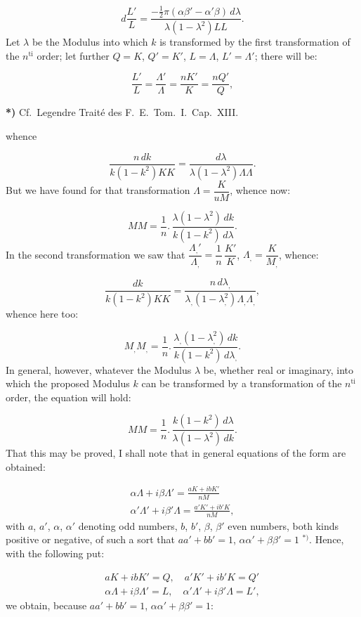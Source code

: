 \documentclass{article}
\begin{document}
\[
d\frac{L'}{L}=\frac{-\frac{1}{2}\pi(\alpha\beta'-\alpha'\beta)\,d\lambda}{\lambda(1-\lambda^{2})LL}.
\]
Let $\lambda$ be the Modulus into which $k$ is transformed by the first transformation of the $n^{\mathrm{ti}}$ order; let further $Q=K$, $Q'=K'$, $L=\Lambda$, $L'=\Lambda'$; there will be:

\[
\frac{L'}{L}=\frac{\Lambda'}{\Lambda}=\frac{nK'}{K}=\frac{nQ'}{Q},
\]

\textbf{*)} Cf.\ Legendre Traité des F.\ E.\ Tom.\ I.\ Cap.\ XIII.


whence

\[
\frac{n\,dk}{k(1-k^{2})KK}=\frac{d\lambda}{\lambda(1-\lambda^{2})\Lambda\Lambda}.
\]
But we have found for that transformation $\Lambda=\dfrac{K}{uM}$, whence now:

\[
MM=\frac{1}{n}.\,\frac{\lambda(1-\lambda^{2})\,dk}{k(1-k^{2})\,d\lambda}.
\]
In the second transformation we saw that $\dfrac{\Lambda_{,}'}{\Lambda_{,}}=\dfrac{1}{n}\,\dfrac{K'}{K}$, $\Lambda_{,}=\dfrac{K}{M_{,}}$, whence:

\[
\frac{dk}{k(1-k^{2})KK}=\frac{n\,d\lambda_{,}}{\lambda_{,}(1-\lambda_{,}^{2})\Lambda_{,}\Lambda_{,}},
\]
whence here too:

\[
M_{,}M_{,}=\frac{1}{n}.\,\frac{\lambda_{,}(1-\lambda_{,}^{2})\,dk}{k(1-k^{2})\,d\lambda_{,}}.
\]
In general, however, whatever the Modulus $\lambda$ be, whether real or imaginary, into which the proposed Modulus $k$ can be transformed by a transformation of the $n^{\mathrm{ti}}$ order, the equation will hold:

\[
MM=\frac{1}{n}.\,\frac{k(1-k^{2})\,d\lambda}{\lambda(1-\lambda^{2})\,dk}.
\]
That this may be proved, I shall note that in general equations of the form are obtained:

\[
\begin{gathered}
\alpha\Lambda+i\beta\Lambda'=\frac{aK+ibK'}{nM}\\[1.5ex]
\alpha'\Lambda'+i\beta'\Lambda=\frac{a'K'+ib'K}{nM},
\end{gathered}
\]
with $a$, $a'$, $\alpha$, $\alpha'$ denoting odd numbers, $b$, $b'$, $\beta$, $\beta'$ even numbers, both kinds positive or negative, of such a sort that $aa'+bb'=1$, $\alpha\alpha'+\beta\beta'=1$ ${}^{*)}$. Hence, with the following put:

\[
\begin{gathered}
aK+ibK'=Q,\quad a'K'+ib'K=Q'\\[1ex]
\alpha\Lambda+i\beta\Lambda'=L,\quad\alpha'\Lambda'+i\beta'\Lambda=L',
\end{gathered}
\]
we obtain, because $aa'+bb'=1$, $\alpha\alpha'+\beta\beta'=1$:
\end{document}
